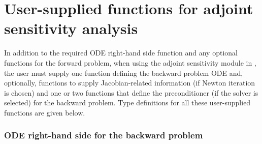 \section{User-supplied functions for adjoint sensitivity analysis}\label{ss:user_fct_adj}
In addition to the required ODE right-hand side function and any optional functions
for the forward problem, when using the adjoint sensitivity module in {\cvodes},
the user must supply one function defining the backward problem ODE and, optionally,
functions to supply Jacobian-related information (if Newton iteration is chosen) and
one or two functions that define the preconditioner (if the {\cvspgmr} solver is
selected) for the backward problem.
Type definitions for all these user-supplied functions are given below.

\subsubsection{ODE right-hand side for the backward problem}

